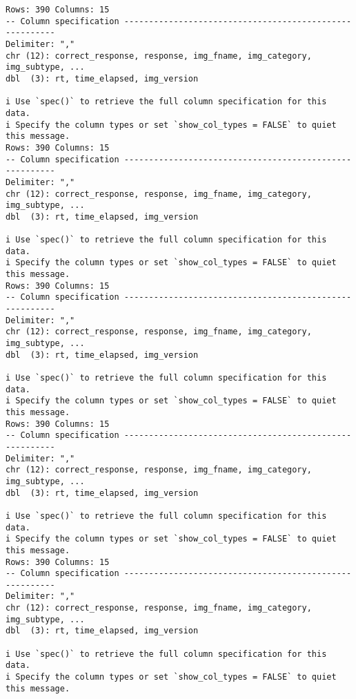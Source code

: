 \documentclass[
  letterpaper,
  DIV=11,
  numbers=noendperiod]{scrartcl}
\begin{document}
\begin{verbatim}
Rows: 390 Columns: 15
-- Column specification --------------------------------------------------------
Delimiter: ","
chr (12): correct_response, response, img_fname, img_category, img_subtype, ...
dbl  (3): rt, time_elapsed, img_version

i Use `spec()` to retrieve the full column specification for this data.
i Specify the column types or set `show_col_types = FALSE` to quiet this message.
Rows: 390 Columns: 15
-- Column specification --------------------------------------------------------
Delimiter: ","
chr (12): correct_response, response, img_fname, img_category, img_subtype, ...
dbl  (3): rt, time_elapsed, img_version

i Use `spec()` to retrieve the full column specification for this data.
i Specify the column types or set `show_col_types = FALSE` to quiet this message.
Rows: 390 Columns: 15
-- Column specification --------------------------------------------------------
Delimiter: ","
chr (12): correct_response, response, img_fname, img_category, img_subtype, ...
dbl  (3): rt, time_elapsed, img_version

i Use `spec()` to retrieve the full column specification for this data.
i Specify the column types or set `show_col_types = FALSE` to quiet this message.
Rows: 390 Columns: 15
-- Column specification --------------------------------------------------------
Delimiter: ","
chr (12): correct_response, response, img_fname, img_category, img_subtype, ...
dbl  (3): rt, time_elapsed, img_version

i Use `spec()` to retrieve the full column specification for this data.
i Specify the column types or set `show_col_types = FALSE` to quiet this message.
Rows: 390 Columns: 15
-- Column specification --------------------------------------------------------
Delimiter: ","
chr (12): correct_response, response, img_fname, img_category, img_subtype, ...
dbl  (3): rt, time_elapsed, img_version

i Use `spec()` to retrieve the full column specification for this data.
i Specify the column types or set `show_col_types = FALSE` to quiet this message.
\end{verbatim}
\end{document}
